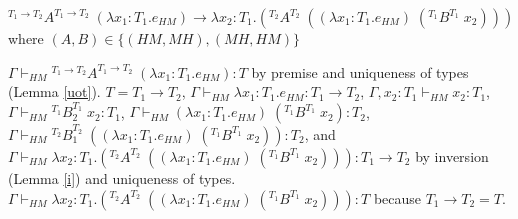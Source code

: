 \begin{case}
$^{T_{1}\rightarrow T_{2}}A^{T_{1}\rightarrow T_{2}}\;(\lambda x_{1}:T_{1}.e_{HM})\rightarrow\lambda x_{2}:T_{1}.(^{T_{2}}A^{T_{2}}\;((\lambda x_{1}:T_{1}.e_{HM})\;(^{T_{1}}B^{T_{1}}\;x_{2})))$ where $(A,B)\in\lbrace(HM,MH),(MH,HM)\rbrace$

$\Gamma\vdash_{HM}{^{T_{1}\rightarrow T_{2}}}A^{T_{1}\rightarrow T_{2}}\;(\lambda x_{1}:T_{1}.e_{HM}):T$ by premise and uniqueness of types (Lemma \ref{uot}).  $T=T_{1}\rightarrow T_{2}$, $\Gamma\vdash_{HM}\lambda x_{1}:T_{1}.e_{HM}:T_{1}\rightarrow T_{2}$, $\Gamma,x_{2}:T_{1}\vdash_{HM}x_{2}:T_{1}$, $\Gamma\vdash_{HM}{^{T_{1}}B}_{2}^{T_{1}}\;x_{2}:T_{1}$, $\Gamma\vdash_{HM}(\lambda x_{1}:T_{1}.e_{HM})\;(^{T_{1}}B^{T_{1}}\;x_{2}):T_{2}$, $\Gamma\vdash_{HM}{^{T_{2}}B}_{1}^{T_{2}}\;((\lambda x_{1}:T_{1}.e_{HM})\;(^{T_{1}}B^{T_{1}}\;x_{2})):T_{2}$, and $\Gamma\vdash_{HM}\lambda x_{2}:T_{1}.(^{T_{2}}A^{T_{2}}\;((\lambda x_{1}:T_{1}.e_{HM})\;(^{T_{1}}B^{T_{1}}\;x_{2}))):T_{1}\rightarrow T_{2}$ by inversion (Lemma \ref{i}) and uniqueness of types.  $\Gamma\vdash_{HM}\lambda x_{2}:T_{1}.(^{T_{2}}A^{T_{2}}\;((\lambda x_{1}:T_{1}.e_{HM})\;(^{T_{1}}B^{T_{1}}\;x_{2}))):T$ because $T_{1}\rightarrow T_{2}=T$.
\end{case}
